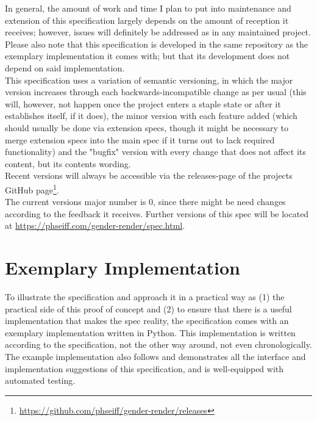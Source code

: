 \documentclass{article}
\begin{document}
    In general, the amount of work and time I plan to put into maintenance and extension of this specification largely depends on the amount of reception it receives;
    however, issues will definitely be addressed as in any maintained project.
    Please also note that this specification is developed in the same repository as the exemplary implementation it comes with;
    but that its development does not depend on said implementation.\\

    This specification uses a variation of semantic versioning, in which the major version increases through each backwards-incompatible change as per usual (this will, however, not happen once the project enters a staple state or after it establishes itself, if it does), the minor version with each feature added (which should usually be done via extension specs, though it might be necessary to merge extension specs into the main spec if it turns out to lack required functionality) and the "bugfix" version with every change that does not affect its content, but its contents wording.\\

    Recent versions will always be accessible via the releases-page of the projects GitHub page\footnote{\url{https://github.com/phseiff/gender-render/releases}}.\\

    The current versions major number is 0, since there might be need changes according to the feedback it receives.
    Further versions of this spec will be located at \url{https://phseiff.com/gender-render/spec.html}.\\

\section{Exemplary Implementation}

    To illustrate the specification and approach it in a practical way as (1) the practical side of this proof of concept and (2) to ensure that there is a useful implementation that makes the spec reality, the specification comes with an exemplary implementation written in Python.
    This implementation is written according to the specification, not the other way around, not even chronologically.
    The example implementation also follows and demonstrates all the interface and implementation suggestions of this specification, and is well-equipped with automated testing.\\
\end{document}
